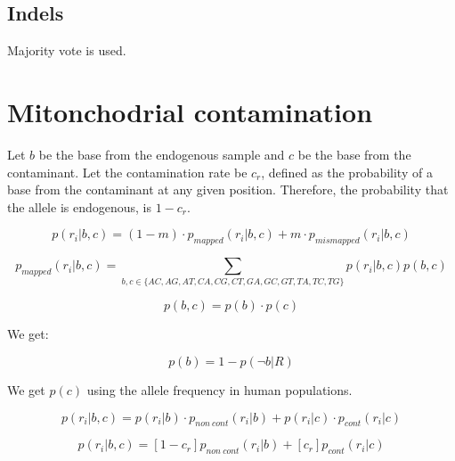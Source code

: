 \documentclass[a4paper,12pt]{article}
\begin{document}
\subsection{Indels}


Majority vote is used.




\section{Mitonchodrial contamination}

Let $b$ be the base from the endogenous sample and $c$ be the base from the contaminant. Let the contamination rate be $c_r$, defined as the probability of a base from the contaminant at any given position. Therefore, the probability that the allele is endogenous, is $1-c_r$.

\begin{equation}
p(r_i|b,c)  = (1-m) \cdot p_{mapped}(r_i|b,c) + m \cdot p_{mismapped}(r_i|b,c)  %
\end{equation}


\begin{equation}
p_{mapped}(r_i|b,c) = \sum\limits_{ b,c \in \{AC,AG,AT,CA,CG,CT,GA,GC,GT,TA,TC,TG\} } p(r_i|b,c) p(b,c)
\end{equation}

\begin{equation}
p(b,c) = p(b) \cdot p(c)
\end{equation}

\noindent We get:

\begin{equation}
p(b)  = 1 - p(\neg b|R)
\end{equation}

\noindent  We get $p(c)$ using the allele frequency in human populations.

\begin{equation}
p(r_i|b,c)  =  p(r_i|b) \cdot p_{non\ cont}(r_i|b)  +  p(r_i|c) \cdot p_{cont}(r_i|c) 
\end{equation}


\begin{equation}
p(r_i|b,c)  =  [1-c_r]  p_{non\ cont}(r_i|b) +  [c_r] p_{cont}(r_i|c) 
\end{equation}
\end{document}
